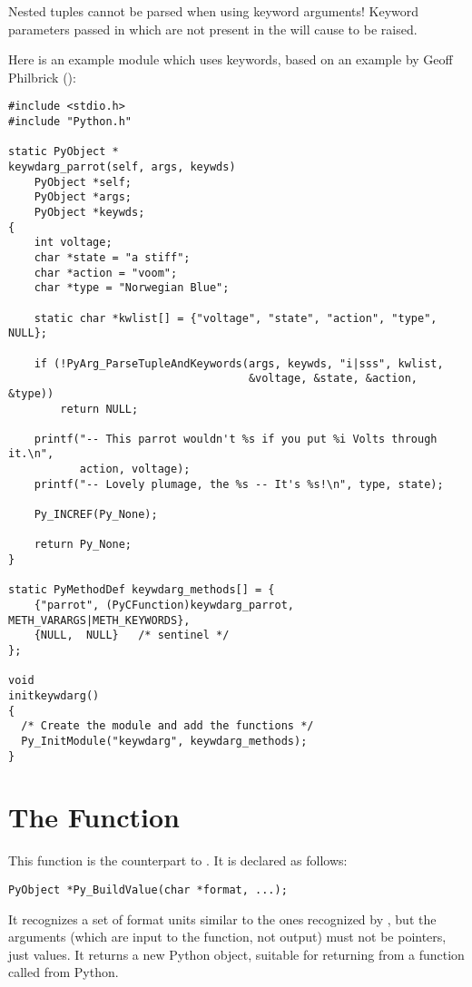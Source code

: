 \documentclass{manual}
\begin{document}
  Nested tuples cannot be parsed when using keyword
arguments!  Keyword parameters passed in which are not present in the
 will cause  to be raised.

Here is an example module which uses keywords, based on an example by
Geoff Philbrick ():%

\begin{verbatim}
#include <stdio.h>
#include "Python.h"

static PyObject *
keywdarg_parrot(self, args, keywds)
    PyObject *self;
    PyObject *args;
    PyObject *keywds;
{  
    int voltage;
    char *state = "a stiff";
    char *action = "voom";
    char *type = "Norwegian Blue";

    static char *kwlist[] = {"voltage", "state", "action", "type", NULL};

    if (!PyArg_ParseTupleAndKeywords(args, keywds, "i|sss", kwlist, 
                                     &voltage, &state, &action, &type))
        return NULL; 
  
    printf("-- This parrot wouldn't %s if you put %i Volts through it.\n", 
           action, voltage);
    printf("-- Lovely plumage, the %s -- It's %s!\n", type, state);

    Py_INCREF(Py_None);

    return Py_None;
}

static PyMethodDef keywdarg_methods[] = {
    {"parrot", (PyCFunction)keywdarg_parrot, METH_VARARGS|METH_KEYWORDS},
    {NULL,  NULL}   /* sentinel */
};

void
initkeywdarg()
{
  /* Create the module and add the functions */
  Py_InitModule("keywdarg", keywdarg_methods);
}
\end{verbatim}


\section{The  Function}
\label{buildValue}

This function is the counterpart to .  It is
declared as follows:

\begin{verbatim}
PyObject *Py_BuildValue(char *format, ...);
\end{verbatim}

It recognizes a set of format units similar to the ones recognized by
, but the arguments (which are input to the
function, not output) must not be pointers, just values.  It returns a
new Python object, suitable for returning from a \C{} function called
from Python.
\end{document}
